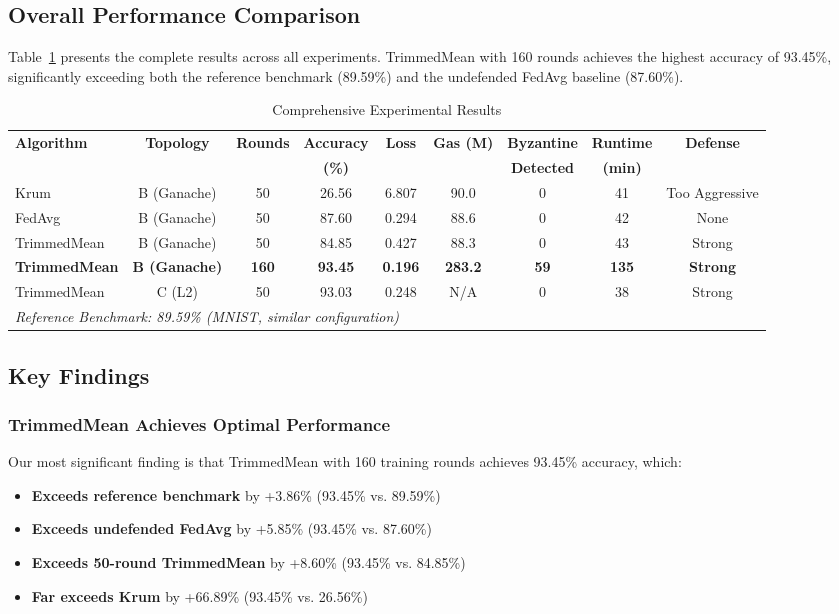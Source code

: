 \documentclass{ieeeaccess}
\begin{document}
\subsection{Overall Performance Comparison}

Table~\ref{tab:overall_results} presents the complete results across all experiments. TrimmedMean with 160 rounds achieves the highest accuracy of 93.45\%, significantly exceeding both the reference benchmark (89.59\%) and the undefended FedAvg baseline (87.60\%).

\begin{table}[t]
\caption{Comprehensive Experimental Results}
\label{tab:overall_results}
\centering
\begin{tabular}{lcccccccc}
\toprule
\textbf{Algorithm} & \textbf{Topology} & \textbf{Rounds} & \textbf{Accuracy} & \textbf{Loss} & \textbf{Gas (M)} & \textbf{Byzantine} & \textbf{Runtime} & \textbf{Defense} \\
& & & \textbf{(\%)} & & & \textbf{Detected} & \textbf{(min)} & \\
\midrule
Krum & B (Ganache) & 50 & 26.56 & 6.807 & 90.0 & 0 & 41 & Too Aggressive \\
FedAvg & B (Ganache) & 50 & 87.60 & 0.294 & 88.6 & 0 & 42 & None \\
TrimmedMean & B (Ganache) & 50 & 84.85 & 0.427 & 88.3 & 0 & 43 & Strong \\
\textbf{TrimmedMean} & \textbf{B (Ganache)} & \textbf{160} & \textbf{93.45} & \textbf{0.196} & \textbf{283.2} & \textbf{59} & \textbf{135} & \textbf{Strong} \\
TrimmedMean & C (L2) & 50 & 93.03 & 0.248 & N/A & 0 & 38 & Strong \\
\midrule
\multicolumn{9}{l}{\textit{Reference Benchmark: 89.59\% (MNIST, similar configuration)}} \\
\bottomrule
\end{tabular}
\end{table}

\subsection{Key Findings}

\subsubsection{TrimmedMean Achieves Optimal Performance}

Our most significant finding is that TrimmedMean with 160 training rounds achieves 93.45\% accuracy, which:
\begin{itemize}
    \item \textbf{Exceeds reference benchmark} by +3.86\% (93.45\% vs. 89.59\%)
    \item \textbf{Exceeds undefended FedAvg} by +5.85\% (93.45\% vs. 87.60\%)
    \item \textbf{Exceeds 50-round TrimmedMean} by +8.60\% (93.45\% vs. 84.85\%)
    \item \textbf{Far exceeds Krum} by +66.89\% (93.45\% vs. 26.56\%)
\end{itemize}
\end{document}
